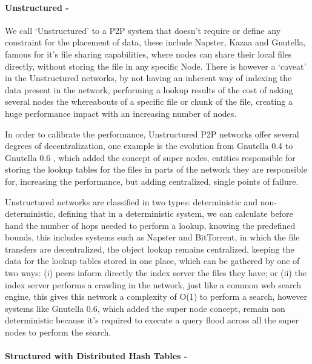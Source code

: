 \paragraph{\textbf{Unstructured -}} %
\label{par:Unstructured}

We call `Unstructured' to a P2P system that doesn't require or define any constraint for the placement of data, these include Napster, Kazaa and Gnutella, famous for it's file sharing capabilities, where nodes can share their local files directly, without storing the file in any specific Node. There is however a `caveat' in the Unstructured networks, by not having an inherent way of indexing the data present in the network, performing a lookup results of the cost of asking several nodes the whereabouts of a specific file or chunk of the file, creating a huge performance impact with an increasing number of nodes. 

In order to calibrate the performance, Unstructured P2P networks offer several degrees of decentralization, one example is the evolution from Gnutella 0.4\cite{Definition2003} to Gnutella 0.6 \cite{T.Klingberg2002}\cite{Ripeanu2002a}, which added the concept of super nodes, entities responsible for storing the lookup tables for the files in parts of the network they are responsible for, increasing the performance, but adding centralized, single points of failure. 

Unstructured networks are classified\cite{Ranjan2006} in two types: deterministic and non-deterministic, defining that in a deterministic system, we can calculate before hand the number of hops needed to perform a lookup, knowing the predefined bounds, this includes systems such as Napster and BitTorrent\cite{Cohen2009}, in which the file transfers are decentralized, the object lookup remains centralized, keeping the data for the lookup tables stored in one place, which can be gathered by one of two ways: (i) peers inform directly the index server the files they have; or (ii) the index server performs a crawling in the network, just like a common web search engine, this gives this network a complexity of O(1) to perform a search, however systems like Gnutella 0.6, which added the super node concept, remain non deterministic because it's required to execute a query flood across all the super nodes to perform the search.


\paragraph{\textbf{Structured with Distributed Hash Tables -}} %
\label{par:Structured with Distributed Hash Tables}

